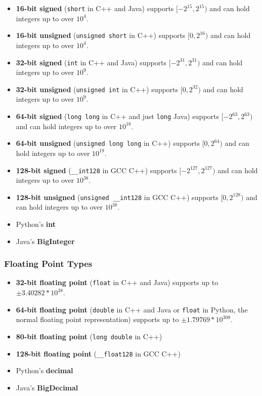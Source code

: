\begin{itemize}
\item \textbf{16-bit signed} (\texttt{short} in C++ and Java) supports $[-2^{15},2^{15})$ and can hold integers up to over $10^4$.
\item \textbf{16-bit unsigned} (\texttt{unsigned short} in C++) supports $[0,2^{16})$ and can hold integers up to over $10^4$.
\item \textbf{32-bit signed} (\texttt{int} in C++ and Java) supports $[-2^{31},2^{31})$ and can hold integers up to over $10^9$.
\item \textbf{32-bit unsigned} (\texttt{unsigned int} in C++) supports $[0,2^{32})$ and can hold integers up to over $10^9$.
\item \textbf{64-bit signed} (\texttt{long long} in C++ and just \texttt{long} Java) supports $[-2^{63},2^{63})$ and can hold integers up to over $10^{18}$.
\item \textbf{64-bit unsigned} (\texttt{unsigned long long} in C++) supports $[0,2^{64})$ and can hold integers up to over $10^{19}$.
\item \textbf{128-bit signed} (\texttt{__int128} in GCC C++) supports $[-2^{127},2^{127})$ and can hold integers up to over $10^{38}$.
\item \textbf{128-bit unsigned} (\texttt{unsigned __int128} in GCC C++) supports $[0,2^{128})$ and can hold integers up to over $10^{38}$.
\item Python's \textbf{int} 
\item Java's \textbf{BigInteger}
\end{itemize}

\subsubsection{Floating Point Types}

\begin{itemize}
\item \textbf{32-bit floating point} (\texttt{float} in C++ and Java) supports up to $\pm3.40282 * 10^{38}$.
\item \textbf{64-bit floating point} (\texttt{double} in C++ and Java or \texttt{float} in Python, the normal floating point representation) supports up to $\pm1.79769 * 10^{308}$.
\item \textbf{80-bit floating point} (\texttt{long double} in C++)
\item \textbf{128-bit floating point} (\texttt{__float128} in GCC C++)
\item Python's \textbf{decimal}
\item Java's \textbf{BigDecimal}
\end{itemize}

